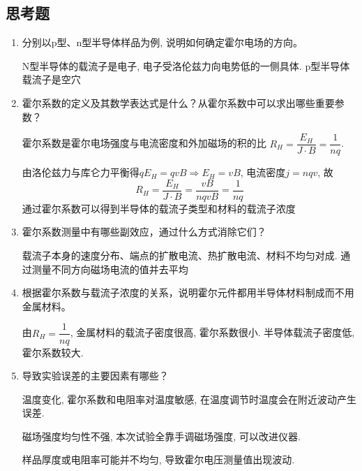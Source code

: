 \documentclass[UTF8]{ctexart}
\begin{document}
\subsection{思考题}
\begin{enumerate}
    \item 分别以p型、n型半导体样品为例, 说明如何确定霍尔电场的方向。\par N型半导体的载流子是电子, 电子受洛伦兹力向电势低的一侧具体. p型半导体载流子是空穴
    \item 霍尔系数的定义及其数学表达式是什么？从霍尔系数中可以求出哪些重要参数？\par 霍尔系数是霍尔电场强度与电流密度和外加磁场的积的比 $R_H=\dfrac{E_H}{J\cdot B}=\dfrac1{nq}$.\par 由洛伦兹力与库仑力平衡得$qE_{H}=qvB\Rightarrow E_{H}=vB$, 电流密度$j=nqv$, 故$$R_H=\dfrac{E_H}{J\cdot B}=\dfrac{vB}{nqvB}=\dfrac1{nq}$$ 通过霍尔系数可以得到半导体的载流子类型和材料的载流子浓度
    \item 霍尔系数测量中有哪些副效应，通过什么方式消除它们？\par 载流子本身的速度分布、端点的扩散电流、热扩散电流、材料不均匀对成. 通过测量不同方向磁场电流的值并去平均
    \item 根据霍尔系数与载流子浓度的关系，说明霍尔元件都用半导体材料制成而不用金属材料。 \par 由$R_H=\dfrac 1{nq}$, 金属材料的载流子密度很高, 霍尔系数很小. 半导体载流子密度低, 霍尔系数较大.
    \item 导致实验误差的主要因素有哪些？\par 温度变化, 霍尔系数和电阻率对温度敏感, 在温度调节时温度会在附近波动产生误差.\par 磁场强度均匀性不强, 本次试验全靠手调磁场强度, 可以改进仪器.\par 样品厚度或电阻率可能并不均匀, 导致霍尔电压测量值出现波动.
\end{enumerate}
\end{document}
